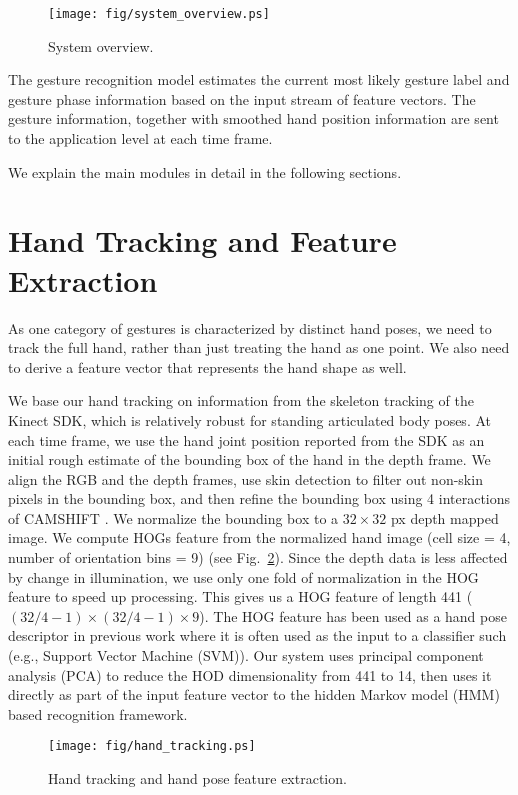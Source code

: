 \begin{figure}[!t]
\centering
\texttt{[image: fig/system\_overview.ps]}
\caption{System overview.}
\label{fig:system}
\end{figure}

The gesture recognition model estimates the current most likely gesture label
and gesture phase information based on the input stream of
feature vectors. The gesture information, 
together with smoothed hand position information are sent to the application level at each time frame.

We explain the main modules in detail in the following sections.

\section{Hand Tracking and Feature Extraction}
As one category of gestures is characterized by distinct hand poses,
we need to track the full hand, rather than just treating the hand as one point. We
also need to derive a feature vector that represents the hand shape as well.

We base our hand tracking on information from the skeleton tracking of the
Kinect SDK, which is relatively robust for standing articulated body poses. At
each time frame, we use the hand joint position reported from the SDK as an
initial rough estimate of the bounding box of the hand in the depth frame.
We align the RGB and the depth frames, use skin detection to filter out
non-skin pixels in the bounding box, and then refine the bounding box using 4
interactions of CAMSHIFT \cite{bradski98}. We normalize the bounding box to a $32\times 32$ px depth
mapped image. We compute HOGs
feature from the normalized hand image (cell size =
4, number of orientation bins = 9) (see Fig.~\ref{fig:tracking}).
Since the depth data is less affected by change in illumination, we use only one
fold of normalization in the HOG feature to speed up processing.
This gives us a HOG feature of length 441 ($(32/4 - 1)\times (32/4 - 1)\times 9$). The HOG
feature has been used as a hand pose descriptor in previous work \cite{song12}
where it is often used as the input to a classifier such (e.g., Support Vector
Machine (SVM)). Our system uses principal component analysis (PCA)
to reduce the HOD dimensionality from 441 to 14, then uses it directly as part
of the input feature vector to the hidden Markov model (HMM) based recognition framework.

\begin{figure}[!t]
\centering
\texttt{[image: fig/hand\_tracking.ps]}
\caption{Hand tracking and hand pose feature extraction.}
\label{fig:tracking}
\end{figure}

